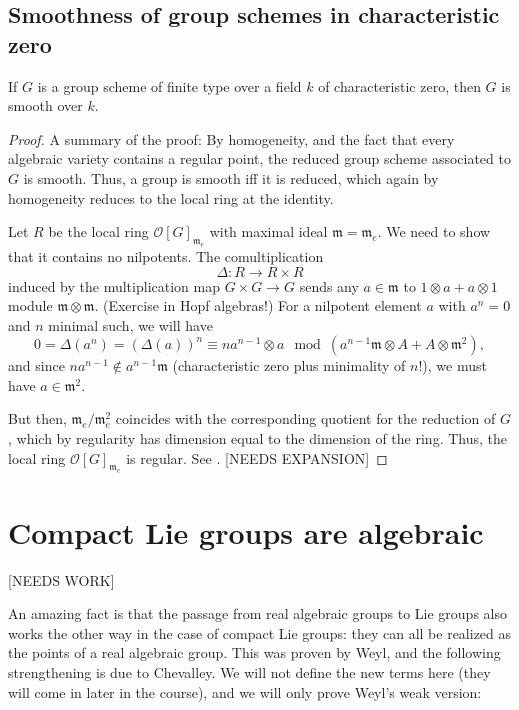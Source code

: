 \subsection{Smoothness of group schemes in characteristic zero}
\label{subsection-smoothness-characteristiczero}
\begin{theorem}
\label{theorem-smoothness-characteristiczero}
If $G$ is a group scheme of finite type over a field $k$ of characteristic zero, then $G$ is smooth over $k$. 
\end{theorem}

\begin{proof}
A summary of the proof: By homogeneity, and the fact that every algebraic variety contains a regular point, the reduced group scheme associated to $G$ is smooth. Thus, a group is smooth iff it is reduced, which again by homogeneity reduces to the local ring at the identity. 

Let $R$ be the local ring $\mathcal O[G]_{\mathfrak m_e}$ with maximal ideal $\mathfrak m=\mathfrak m_e$. We need to show that it contains no nilpotents. The comultiplication
$$ \Delta: R\to R\times R$$
induced by the multiplication map $G\times G\to G$ sends any $a\in \mathfrak m$ to $1\otimes a + a \otimes 1$ module $\mathfrak m \otimes \mathfrak m$. (Exercise in Hopf algebras!) For a nilpotent element $a$ with $a^n=0$ and $n$ minimal such, we will have 
$$ 0=\Delta(a^n)=(\Delta(a))^n \equiv na^{n-1} \otimes a \mod \left( a^{n-1}\mathfrak m \otimes A + A \otimes \mathfrak m^2 \right),$$
and since $na^{n-1} \notin a^{n-1} \mathfrak m$ (characteristic zero plus minimality of $n$!), we must have $a\in \mathfrak m^2$. 

But then, $\mathfrak m_e/\mathfrak m_e^2$ coincides with the corresponding quotient for the reduction of $G$, which by regularity has dimension equal to the dimension of the ring. Thus, the local ring $\mathcal O[G]_{\mathfrak m_e}$ is regular. See \cite[\S VI.9]{Milne-AGS}. [NEEDS EXPANSION]
\end{proof}






\section{Compact Lie groups are algebraic}
\label{section-compact-algebraic}

[NEEDS WORK]



An amazing fact is that the passage from real algebraic groups to Lie groups also works the other way in the case of compact Lie groups: they can all be realized as the points of a real algebraic group. This was proven by Weyl, and the following strengthening is due to Chevalley. We will not define the new terms here (they will come in later in the course), and we will only prove Weyl's weak version:


